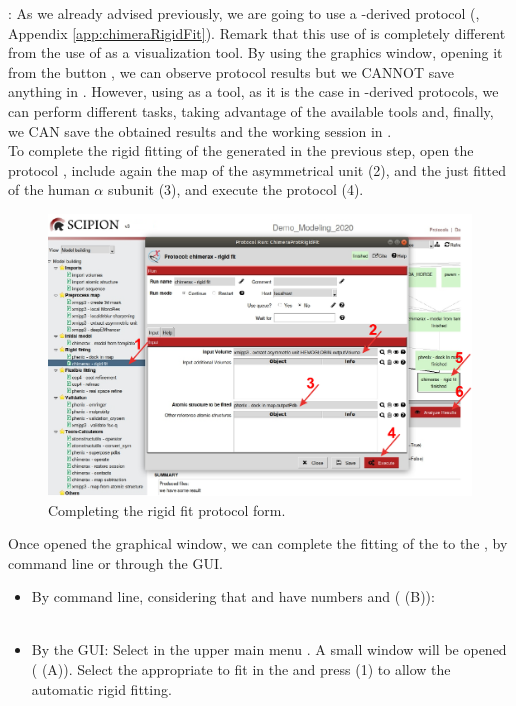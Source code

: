  : As we already advised previously, we are going to use a \chimera-derived protocol (, Appendix \ref{app:chimeraRigidFit}). Remark that this use of \chimera is completely different from the use of \chimera as a visualization tool. By using the \chimera graphics window, opening it from the \scipion button , we can observe protocol results but we CANNOT save anything in \scipion. However, using \chimera as a tool, as it is the case in \scipion \chimera-derived protocols, we can perform different tasks, taking advantage of the available \chimera tools and, finally, we CAN save the obtained results and the working session in \scipion.\\  
 
 To complete the rigid fitting of the  generated in the previous step, open the protocol , include again the map of the asymmetrical unit (2), and the just fitted  of the human  $\alpha$ subunit (3), and execute the protocol (4).
 
 \begin{figure}[H]
  \centering 
  \captionsetup{width=.9\linewidth} 
  \includegraphics[width=1\textwidth]{Images/Fig21}
  \caption{Completing the \chimera rigid fit protocol form.}
  \label{fig:chimera_rigid_fit}
  \end{figure}
  
  Once opened the \chimera graphical window, we can complete the fitting of the  to the , by \chimera command line or through the \chimera GUI. 
    \begin{itemize}
     \item By \chimera command line, considering that  and  have  numbers  and  ( (B)):\\
            \\
    \item By the \chimera GUI: Select in the upper main menu . A small window will be opened ( (A)). Select the appropriate  to fit in the  and press  (1) to allow the automatic rigid fitting.
    \end{itemize}

